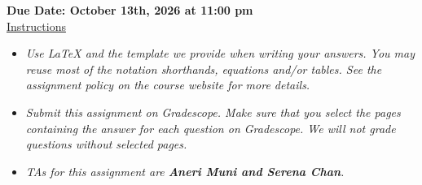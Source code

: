 \documentclass[12pt]{article}
\theoremstyle{definition}
\begin{document}
\fancyhead{}
\fancyfoot{}


\vspace{1cm}

\shorthandoff{:}
{\textbf{Due Date: October 13th, 2026 at 11:00 pm}}\\


\vspace{-0.5cm}
\underline{Instructions}%
\renewcommand{\labelitemi}{\textbullet}

\begin{itemize}
\item \emph{Use LaTeX and the template we provide when writing your answers.
You may reuse most of the notation shorthands, equations and/or tables.
See the assignment policy on the course website for more details.}
\item \emph{Submit this assignment on Gradescope. Make sure that you select the pages containing the answer for each question on Gradescope. We will not grade questions without selected pages.}
\item \emph{TAs for this assignment are \textbf{Aneri Muni and Serena Chan}.}
\end{itemize}
\vspace{0.2cm}
\end{document}
